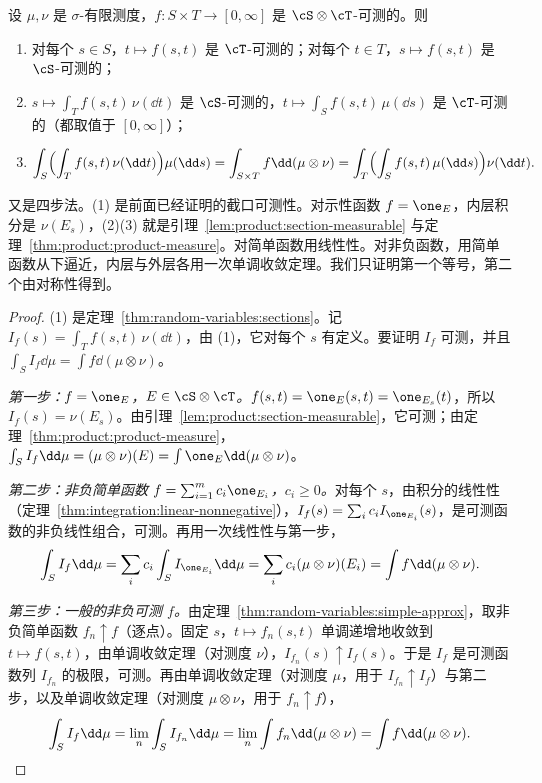 \begin{theorem}[Tonelli 定理]\label{thm:product:tonelli}
设 $\mu,\nu$ 是 $\sigma$-有限测度，$f:S\times T\to[0,\infty]$ 是 $\cS\otimes\cT$-可测的。则
\begin{enumerate}
\item 对每个 $s\in S$，$t\mapsto f(s,t)$ 是 $\cT$-可测的；对每个 $t\in T$，$s\mapsto f(s,t)$ 是 $\cS$-可测的；
\item $s\mapsto\int_Tf(s,t)\,\nu(\dd t)$ 是 $\cS$-可测的，$t\mapsto\int_Sf(s,t)\,\mu(\dd s)$ 是 $\cT$-可测的（都取值于 $[0,\infty]$）；
\item
\[
\int_S\Bigl(\int_Tf(s,t)\,\nu(\dd t)\Bigr)\mu(\dd s)=\int_{S\times T}f\dd(\mu\otimes\nu)=\int_T\Bigl(\int_Sf(s,t)\,\mu(\dd s)\Bigr)\nu(\dd t).
\]
\end{enumerate}
\end{theorem}

\begin{remark}[证明思路]
又是四步法。(1) 是前面已经证明的截口可测性。对示性函数 $f=\one_E$，内层积分是 $\nu(E_s)$，(2)(3) 就是引理~\ref{lem:product:section-measurable} 与定理~\ref{thm:product:product-measure}。对简单函数用线性性。对非负函数，用简单函数从下逼近，内层与外层各用一次单调收敛定理。我们只证明第一个等号，第二个由对称性得到。
\end{remark}

\begin{proof}
(1) 是定理~\ref{thm:random-variables:sections}。记 $I_f(s)=\int_Tf(s,t)\,\nu(\dd t)$，由 (1)，它对每个 $s$ 有定义。要证明 $I_f$ 可测，并且 $\int_SI_f\dd\mu=\int f\dd(\mu\otimes\nu)$。

\emph{第一步：$f=\one_E$，$E\in\cS\otimes\cT$。}$f(s,t)=\one_E(s,t)=\one_{E_s}(t)$，所以 $I_f(s)=\nu(E_s)$。由引理~\ref{lem:product:section-measurable}，它可测；由定理~\ref{thm:product:product-measure}，$\int_SI_f\dd\mu=(\mu\otimes\nu)(E)=\int\one_E\dd(\mu\otimes\nu)$。

\emph{第二步：非负简单函数 $f=\sum_{i=1}^mc_i\one_{E_i}$，$c_i\geqslant0$。}对每个 $s$，由积分的线性性（定理~\ref{thm:integration:linear-nonnegative}），$I_f(s)=\sum_ic_iI_{\one_{E_i}}(s)$，是可测函数的非负线性组合，可测。再用一次线性性与第一步，
\[
\int_SI_f\dd\mu=\sum_ic_i\int_SI_{\one_{E_i}}\dd\mu=\sum_ic_i(\mu\otimes\nu)(E_i)=\int f\dd(\mu\otimes\nu).
\]

\emph{第三步：一般的非负可测 $f$。}由定理~\ref{thm:random-variables:simple-approx}，取非负简单函数 $f_n\uparrow f$（逐点）。固定 $s$，$t\mapsto f_n(s,t)$ 单调递增地收敛到 $t\mapsto f(s,t)$，由单调收敛定理（对测度 $\nu$），$I_{f_n}(s)\uparrow I_f(s)$。于是 $I_f$ 是可测函数列 $I_{f_n}$ 的极限，可测。再由单调收敛定理（对测度 $\mu$，用于 $I_{f_n}\uparrow I_f$）与第二步，以及单调收敛定理（对测度 $\mu\otimes\nu$，用于 $f_n\uparrow f$），
\[
\int_SI_f\dd\mu=\lim_n\int_SI_{f_n}\dd\mu=\lim_n\int f_n\dd(\mu\otimes\nu)=\int f\dd(\mu\otimes\nu).\qedhere
\]
\end{proof}

